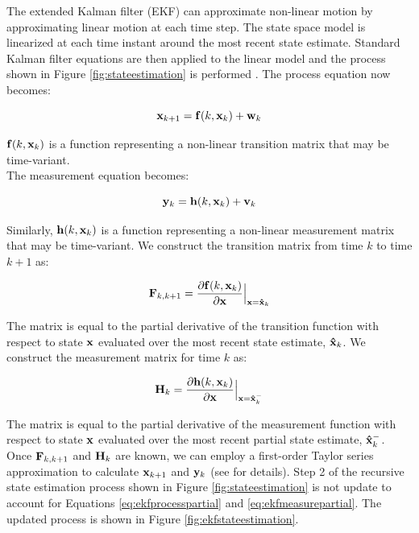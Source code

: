 \documentclass[11pt]{article}
\begin{document}
The extended Kalman filter (EKF) can approximate non-linear motion by approximating linear motion at each time step. The state space model is linearized at each time instant around the most recent state estimate. Standard Kalman filter equations are then applied to the linear model and the process shown in Figure \ref{fig:stateestimation} is performed \cite{kalman}. The process equation now becomes:

\begin{equation}
{\bf x}_{k+1} = {\bf f}(k,{\bf x}_k) + {\bf w}_k
\label{eq:ekfprocess}
\end{equation}
\vspace{0.01cm}

${\bf f}(k,{\bf x}_k)$ is a function representing a non-linear transition matrix that may be time-variant. \\ 
The measurement equation becomes:

\begin{equation}
{\bf y}_{k} = {\bf h}(k,{\bf x}_k) + {\bf v}_k
\label{eq:ekfmeasure}
\end{equation}
\vspace{0.01cm}

Similarly, ${\bf h}(k,{\bf x}_k)$ is a function representing a non-linear measurement matrix that may be time-variant. We construct the transition matrix from time $k$ to time $k+1$ as:

\begin{equation}
{\bf F}_{k,k+1}  = \frac{\partial{\bf f}(k,{\bf x}_k)}{\partial {\bf x}} \Bigl \vert _{{\bf x} = {\bf \hat x}_k}
\label{eq:ekfprocesspartial}
\end{equation}
\vspace{0.01cm}

The matrix is equal to the partial derivative of the transition function with respect to state ${\bf x}$ evaluated over the most recent state estimate, ${\bf \hat x}_k$. We construct the measurement matrix for time $k$ as:

\begin{equation}
{\bf H}_{k}  = \frac{\partial{\bf h}(k,{\bf x}_k)}{\partial {\bf x}} \Bigl \vert _{{\bf x} = {\bf \hat x}^-_k}
\label{eq:ekfmeasurepartial}
\end{equation}
\vspace{0.01cm}

The matrix is equal to the partial derivative of the measurement function with respect to state ${\bf x}$ evaluated over the most recent partial state estimate, ${\bf \hat x}^-_k$. Once ${\bf F}_{k,k+1} $ and ${\bf H}_{k}$ are known, we can employ a first-order Taylor series approximation to calculate ${\bf x}_{k+1}$ and ${\bf y}_k$ (see \cite{kalman} for details). Step 2 of the recursive state estimation process shown in Figure \ref{fig:stateestimation} is not update to account for Equations \ref{eq:ekfprocesspartial} and \ref{eq:ekfmeasurepartial}. The updated process is shown in Figure \ref{fig:ekfstateestimation}.
\end{document}
